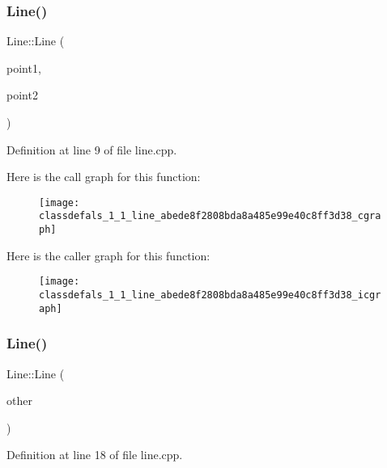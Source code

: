 \subsubsection{\texorpdfstring{Line()}{Line()}\hspace{0.1cm}{\footnotesize\ttfamily [1/2]}}
{\footnotesize\ttfamily Line\+::\+Line (\begin{DoxyParamCaption}\item[{\hyperlink{classdefals_1_1_interest_point}{Interest\+Point}}]{point1,  }\item[{\hyperlink{classdefals_1_1_interest_point}{Interest\+Point}}]{point2 }\end{DoxyParamCaption})}



Definition at line 9 of file line.\+cpp.

Here is the call graph for this function\+:\nopagebreak
\begin{figure}[H]
\begin{center}
\leavevmode
\texttt{[image: classdefals\_1\_1\_line\_abede8f2808bda8a485e99e40c8ff3d38\_cgraph]}
\end{center}
\end{figure}
Here is the caller graph for this function\+:\nopagebreak
\begin{figure}[H]
\begin{center}
\leavevmode
\texttt{[image: classdefals\_1\_1\_line\_abede8f2808bda8a485e99e40c8ff3d38\_icgraph]}
\end{center}
\end{figure}
\mbox{\label{classdefals_1_1_line_ac40968264c0af3b70506c13ce3b70b5b}} 
\subsubsection{\texorpdfstring{Line()}{Line()}\hspace{0.1cm}{\footnotesize\ttfamily [2/2]}}
{\footnotesize\ttfamily Line\+::\+Line (\begin{DoxyParamCaption}\item[{const \hyperlink{classdefals_1_1_line}{Line} \&}]{other }\end{DoxyParamCaption})}



Definition at line 18 of file line.\+cpp.

